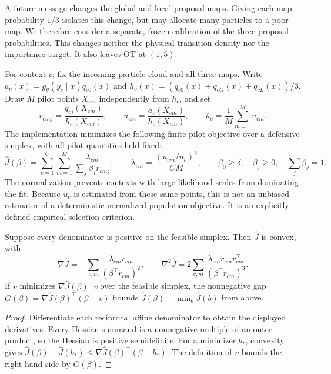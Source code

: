 A future message changes the global and local proposal maps. Giving each map
probability $1/3$ isolates this change, but may allocate many particles to a
poor map. We therefore consider a separate, frozen calibration of the three
proposal probabilities. This changes neither the physical transition density
nor the importance target. It also leaves OT at $(1,5)$.

For context $c$, fix the incoming particle cloud and all three maps. Write
$a_c(x)=g_\theta(y_c\mid x)q_{c0}(x)$ and
$h_c(x)=(q_{c0}(x)+q_{cG}(x)+q_{cL}(x))/3$. Draw $M$ pilot points
$X_{cm}$ independently from $h_c$, and set
\[
 r_{cmj}=\frac{q_{cj}(X_{cm})}{h_c(X_{cm})},\qquad
 u_{cm}=\frac{a_c(X_{cm})}{h_c(X_{cm})},\qquad
 \bar u_c=\frac1M\sum_{m=1}^M u_{cm}.
\]
The implementation minimizes the following finite-pilot objective over a
defensive simplex, with all pilot quantities held fixed:
\[
 \widehat J(\beta)=\sum_{c=1}^C\sum_{m=1}^M
 \frac{\lambda_{cm}}{\sum_j\beta_jr_{cmj}},\qquad
 \lambda_{cm}=\frac{(u_{cm}/\bar u_c)^2}{CM},\qquad
 \beta_0\geq\delta,\quad\beta_j\geq0,\quad\sum_j\beta_j=1.
\]
The normalization prevents contexts with large likelihood scales from
dominating the fit. Because $\bar u_c$ is estimated from these same points,
this is not an unbiased estimator of a deterministic normalized population
objective. It is an explicitly defined empirical selection criterion.

\begin{proposition}
\label{prop:bg-sir-beta-convex}
Suppose every denominator is positive on the feasible simplex. Then
$\widehat J$ is convex, with
\[
 \nabla\widehat J=-\sum_{c,m}\frac{\lambda_{cm}r_{cm}}
 {(\beta^\top r_{cm})^2},\qquad
 \nabla^2\widehat J=2\sum_{c,m}\frac{\lambda_{cm}r_{cm}r_{cm}^\top}
 {(\beta^\top r_{cm})^3}.
\]
If $v$ minimizes $\nabla\widehat J(\beta)^\top v$ over the feasible
simplex, the nonnegative gap
$G(\beta)=\nabla\widehat J(\beta)^\top(\beta-v)$ bounds
$\widehat J(\beta)-\min_b\widehat J(b)$ from above.
\end{proposition}
\begin{proof}
Differentiate each reciprocal affine denominator to obtain the displayed
derivatives. Every Hessian summand is a nonnegative multiple of an outer
product, so the Hessian is positive semidefinite. For a minimizer $b_*$,
convexity gives
$\widehat J(\beta)-\widehat J(b_*)\leq
\nabla\widehat J(\beta)^\top(\beta-b_*)$.
The definition of $v$ bounds the right-hand side by $G(\beta)$.
\end{proof}

